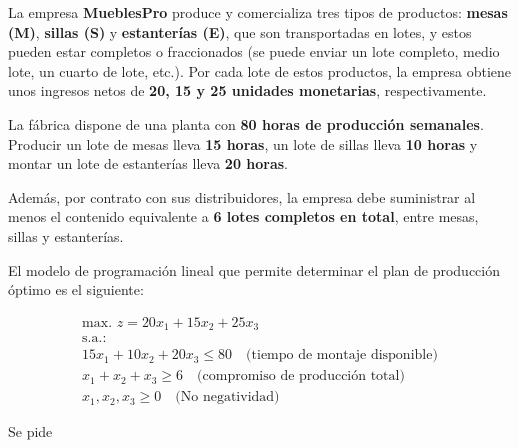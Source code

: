 La empresa \textbf{MueblesPro} produce y comercializa tres tipos de productos: \textbf{mesas (M)}, \textbf{sillas (S)} y \textbf{estanterías (E)}, que son transportadas en lotes, y estos pueden estar completos o fraccionados (se puede enviar un lote completo, medio lote, un cuarto de lote, etc.). Por cada lote de estos productos, la empresa obtiene unos ingresos netos de \textbf{20, 15 y 25 unidades monetarias}, respectivamente.

La fábrica dispone de una planta con \textbf{80 horas de producción semanales}. Producir un lote de mesas lleva \textbf{15 horas}, un lote de sillas lleva \textbf{10 horas} y montar un lote de estanterías lleva \textbf{20 horas}.

Además, por contrato con sus distribuidores, la empresa debe suministrar al menos el contenido equivalente a \textbf{6 lotes completos en total}, entre mesas, sillas y estanterías.

El modelo de programación lineal que permite determinar el plan de producción óptimo es el siguiente:

\begin{equation}
\begin{split}
\text{max. } z = 20x_1 + 15x_2 + 25x_3 \\
\text{s.a.:} \\
15x_1 + 10x_2 + 20x_3 \leq 80 \quad \text{(tiempo de montaje disponible)} \\
x_1 + x_2 + x_3 \geq 6 \quad \text{(compromiso de producción total)} \\
x_1, x_2, x_3 \geq 0 \quad \text{(No negatividad)}
\end{split}
\end{equation}

Se pide

